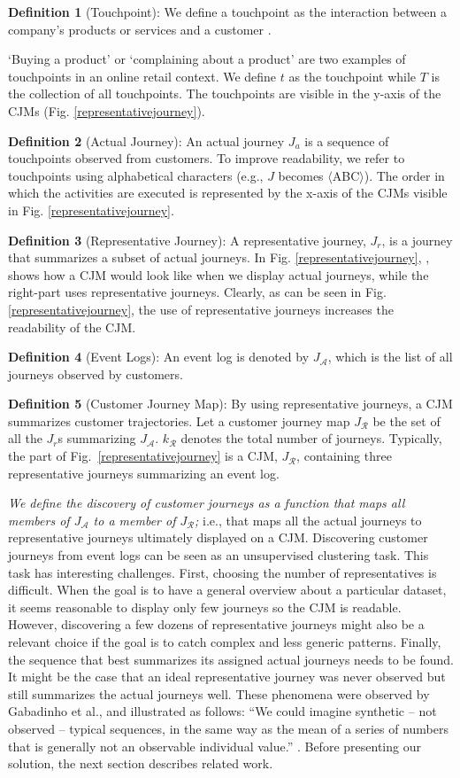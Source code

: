 \documentclass[runningheads]{llncs}
\begin{document}
\textbf{Definition 1} (Touchpoint): We define a touchpoint as the interaction between a company's products or services and a customer \cite{bernard2017cjm}. {`Buying a product' or `complaining about a product' are two examples of touchpoints in an online retail context. We define $t$ as the touchpoint while $T$ is the collection of all touchpoints. The touchpoints are visible in the y-axis of the CJMs (Fig. \ref{representativejourney}).

\textbf{Definition 2} (Actual Journey): An actual journey $J_a$ is a sequence of touchpoints observed from customers. To improve readability, we refer to touchpoints using alphabetical characters (e.g., $J$ becomes $\langle$ABC$\rangle$). The order in which the activities are executed is represented by the x-axis of the CJMs visible in Fig. \ref{representativejourney}.

\textbf{Definition 3} (Representative Journey): A representative journey, $J_{r}$, is a journey that summarizes a subset of actual journeys. In Fig. \ref{representativejourney}, , shows how a CJM would look like when we display actual journeys, while the right-part uses representative journeys. Clearly, as can be seen in Fig. \ref{representativejourney}, the use of  representative journeys increases the readability of the CJM. 

\textbf{Definition 4} (Event Logs): An event log is denoted by $J_{\mathcal{A}}$, which is the list of all journeys observed by customers. 

\textbf{Definition 5} (Customer Journey Map): By using representative journeys, a CJM summarizes customer trajectories. Let a customer journey map $J_{\mathcal{R}}$ be the set of all the $J_{r}$s summarizing $J_{\mathcal{A}}$. $k_{\mathcal{R}}$ denotes the total number of journeys. Typically, the part  of Fig.~\ref{representativejourney} is a CJM, $J_{\mathcal{R}}$, containing three representative journeys summarizing an event log.

{\it We define the discovery of customer journeys as a function that maps all members of $J_{\mathcal{A}}$ to a member of $J_{\mathcal{R}}$;} i.e., that maps all the actual journeys to representative journeys ultimately displayed on a CJM. Discovering customer journeys from event logs can be seen as an unsupervised clustering task. This task has interesting challenges. First, choosing the number of representatives is difficult. When the goal is to have a general overview about a particular dataset, it seems reasonable to display only few journeys so the CJM is readable. However, discovering a few dozens of representative journeys might also be a relevant choice if the goal is to catch complex and less generic patterns. Finally, the sequence that best summarizes its assigned actual journeys needs to be found. It might be the case that an ideal representative journey was never observed but still summarizes the actual journeys well. These phenomena were observed by Gabadinho et al., and illustrated as follows: ``We could imagine synthetic -- not observed -- typical sequences, in the same way as the mean of a series of numbers that is generally not an observable individual value.'' \cite{gabadinho2009extracting}. Before presenting our solution, the next section describes related work.

}
\end{document}
